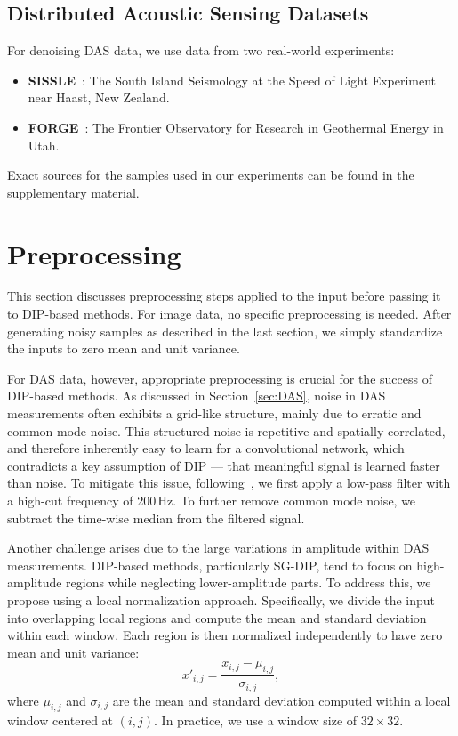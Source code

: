 \subsection{Distributed Acoustic Sensing Datasets}

For denoising DAS data, we use data from two real-world experiments:
\begin{itemize}
    \item \textbf{SISSLE}~\cite{SISSLE}: The South Island Seismology at the Speed of Light Experiment near Haast, New Zealand.
    \item \textbf{FORGE}~\cite{FORGE}: The Frontier Observatory for Research in Geothermal Energy in Utah.
\end{itemize}
Exact sources for the samples used in our experiments can be found in the supplementary material.


\section{Preprocessing}

This section discusses preprocessing steps applied to the input before passing it to DIP-based methods.
For image data, no specific preprocessing is needed.
After generating noisy samples as described in the last section, we simply standardize the inputs to zero mean and unit variance.

For DAS data, however, appropriate preprocessing is crucial for the success of DIP-based methods.
As discussed in Section~\ref{sec:DAS}, noise in DAS measurements often exhibits a grid-like structure, mainly due to erratic and common mode noise.
This structured noise is repetitive and spatially correlated, and therefore inherently easy to learn for a convolutional network, which contradicts a key assumption of DIP --- that meaningful signal is learned faster than noise.
To mitigate this issue, following~\cite{IDF}, we first apply a low-pass filter with a high-cut frequency of 200\,Hz.
To further remove common mode noise, we subtract the time-wise median from the filtered signal.

Another challenge arises due to the large variations in amplitude within DAS measurements.
DIP-based methods, particularly SG-DIP, tend to focus on high-amplitude regions while neglecting lower-amplitude parts.
To address this, we propose using a local normalization approach.
Specifically, we divide the input into overlapping local regions and compute the mean and standard deviation within each window.
Each region is then normalized independently to have zero mean and unit variance:
\begin{equation}
    x'_{i,j} = \frac{x_{i,j} - \mu_{i,j}}{\sigma_{i,j}},
\end{equation}
where $\mu_{i,j}$ and $\sigma_{i,j}$ are the mean and standard deviation computed within a local window centered at $(i,j)$.
In practice, we use a window size of $32 \times 32$.

